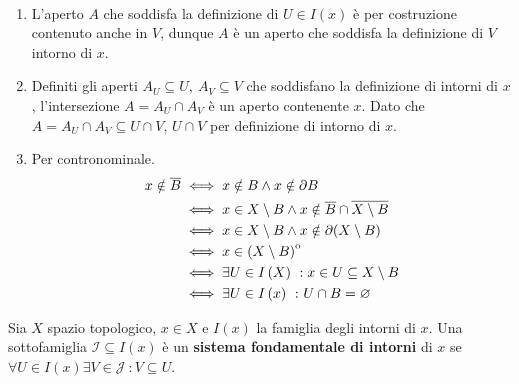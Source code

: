 \begin{demonstration}~{}
	\begin{enumerate}[label=\Roman*]
		\item L'aperto $A$ che soddisfa la definizione di $U\in I\left(x\right)$ è per costruzione contenuto anche in $V$, dunque $A$ è un aperto che soddisfa la definizione di $V$ intorno di $x$.
		\item Definiti gli aperti $A_U\subseteq U,\ A_V\subseteq V$ che soddisfano la definizione di intorni di $x$, l'intersezione $A=A_U\cap A_V$ è un aperto contenente $x$. Dato che $A=A_U\cap A_V\subseteq U\cap V$, $U\cap V$ per definizione di intorno di $x$.
		\item Per contronominale. \begin{align*}
			x\notin \overline{B} &\iff x\notin B \wedge x\notin \partial B\\
			&\iff x\in X\setminus B \wedge x\notin \overline{B}\cap\overline{X\setminus B}\\
			& \iff x\in X\setminus B \wedge x\notin \partial (X\setminus B)\\
			& \iff x\in \interior{\left(X\setminus B\right)}\\
			& \iff \exists U\in I\left(X\right)\ : x\in U\subseteq X\setminus B\\
			&\iff \exists U\in I\left(x\right)\ \colon U\cap B=\emptyset%
		\end{align*} 
	\end{enumerate}
\end{demonstration}
\begin{define}
	Sia $X$ spazio topologico, $x\in X$ e $I\left(x\right)$ la famiglia degli intorni di $x$. Una sottofamiglia $\mathcal{I}\subseteq I\left(x\right)$ è un \textbf{sistema fondamentale di intorni} di $x$ se $\forall U\in I\left(x\right)\exists V\in\mathcal{J}\ \colon V\subseteq U$.
\end{define}

